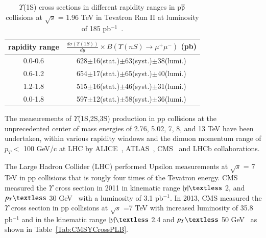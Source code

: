 \begin{table}
 \begin{center}
   \caption[]{ $\Upsilon$(1S) cross sections in different rapidity ranges in p$\overline{\rm p}$
    collisions at $\surd s$ = 1.96 TeV in 
    Tevatron Run II at luminosity of 185 pb$^{-1}$~\cite{D0:2005klj}. }
\label{Tab:YCrossD0RunII}
\begin{tabular}{cc} 
\hline 
\hline
rapidity range             &$\frac{d\sigma(\Upsilon(1S))}{dy}\times B(\Upsilon(nS)\rightarrow\mu^{+}\mu^{-})$ (pb)    \\              
\hline
0.0-0.6                   &628$\pm$16(stat.)$\pm$63(syst.)$\pm$38(lumi.)\\
0.6-1.2                   &654$\pm$17(stat.)$\pm$65(syst.)$\pm$40(lumi.)\\
1.2-1.8                   &515$\pm$16(stat.)$\pm$46(syst.)$\pm$31(lumi.)\\
0.0-1.8                   &597$\pm$12(stat.)$\pm$58(syst.)$\pm$36(lumi.)\\
\hline
\hline
\end{tabular}
\end{center}
\end{table}

The measurements of $\Upsilon$(1S,2S,3S) production in pp collisions at the
unprecedented center of mass energies of 2.76, 5.02, 7, 8, and 13 TeV have been undertaken,
within various rapidity windows and the dimuon momentum range of
$p_{T}<$ 100 GeV/c at LHC by ALICE~\cite{},
ATLAS~\cite{ATLAS:2011nal,ATLAS:2012lmu},
CMS~\cite{CMS:2013qur,CMS:2017dju} and LHCb collaborations.

 The Large Hadron Collider (LHC) performed Upsilon measurements at 
$\surd s$ = 7 TeV in pp collisions that is rougly four times of the Tevatron energy. 
CMS measured the $\Upsilon$ cross section in 2011 in kinematic range 
$|y|\textless$ 2, and $p_{T} \textless$ 30 GeV~\cite{CMS:2010wld} 
with a luminosity of 3.1 pb$^{-1}$.
  In 2013, CMS measured the $\Upsilon$ cross section in pp collisions at $\surd s$ =7 TeV
with increased luminosity of 35.8 pb$^{-1}$ and in the kinematic range
$|y|\textless$ 2.4 and $p_{T}\textless$ 50 GeV~\cite{CMS:2015xqv} as shown in
Table~\ref{Tab:CMSYCrossPLB}.


